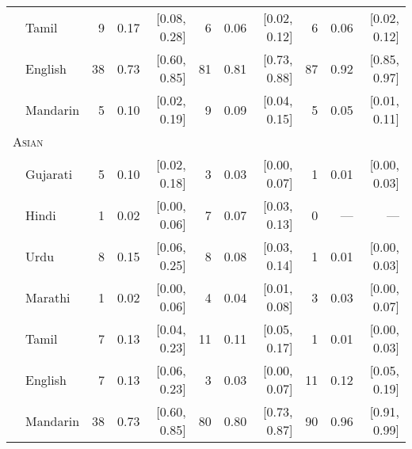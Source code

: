 \begin{table}[H]
\begin{footnotesize}
\begin{tabular}{p{.1in}lrrrrrrrrr}
 & Tamil & 9 & 0.17 & [0.08, 0.28] & 6 & 0.06 & [0.02, 0.12] & 6 & 0.06 & [0.02, 0.12]\\

 & English & 38 & 0.73 & [0.60, 0.85] & 81 & 0.81 & [0.73, 0.88] & 87 & 0.92 & [0.85, 0.97]\\

 & Mandarin & 5 & 0.10 & [0.02, 0.19] & 9 & 0.09 & [0.04, 0.15] & 5 & 0.05 & [0.01, 0.11]\\

\midrule
\multicolumn{11}{l}{\textsc{Asian}}\\
& Gujarati & 5 & 0.10 & [0.02, 0.18] & 3 & 0.03 & [0.00, 0.07] & 1 & 0.01 & [0.00, 0.03]\\

 & Hindi & 1 & 0.02 & [0.00, 0.06] & 7 & 0.07 & [0.03, 0.13] & 0 & --- & ---\\

 & Urdu & 8 & 0.15 & [0.06, 0.25] & 8 & 0.08 & [0.03, 0.14] & 1 & 0.01 & [0.00, 0.03]\\

 & Marathi & 1 & 0.02 & [0.00, 0.06] & 4 & 0.04 & [0.01, 0.08] & 3 & 0.03 & [0.00, 0.07]\\

 & Tamil & 7 & 0.13 & [0.04, 0.23] & 11 & 0.11 & [0.05, 0.17] & 1 & 0.01 & [0.00, 0.03]\\

 & English & 7 & 0.13 & [0.06, 0.23] & 3 & 0.03 & [0.00, 0.07] & 11 & 0.12 & [0.05, 0.19]\\

& Mandarin & 38 & 0.73 & [0.60, 0.85] & 80 & 0.80 & [0.73, 0.87] & 90 & 0.96 & [0.91, 0.99]\\

\bottomrule
\end{tabular}
\end{footnotesize}
\end{table}